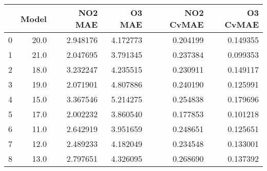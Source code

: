 \begin{tabular}{lrrrrr}
\toprule
{} &  Model &   NO2 MAE &    O3 MAE &  NO2 CvMAE &  O3 CvMAE \\
\midrule
0 &   20.0 &  2.948176 &  4.172773 &   0.204199 &  0.149355 \\
1 &   21.0 &  2.047695 &  3.791345 &   0.237384 &  0.099353 \\
2 &   18.0 &  3.232247 &  4.235515 &   0.230911 &  0.149117 \\
3 &   19.0 &  2.071901 &  4.807886 &   0.240190 &  0.125991 \\
4 &   15.0 &  3.367546 &  5.214275 &   0.254838 &  0.179696 \\
5 &   17.0 &  2.002232 &  3.860540 &   0.177853 &  0.101218 \\
6 &   11.0 &  2.642919 &  3.951659 &   0.248651 &  0.125651 \\
7 &   12.0 &  2.489233 &  4.182049 &   0.234548 &  0.133001 \\
8 &   13.0 &  2.797651 &  4.326095 &   0.268690 &  0.137392 \\
\bottomrule
\end{tabular}
